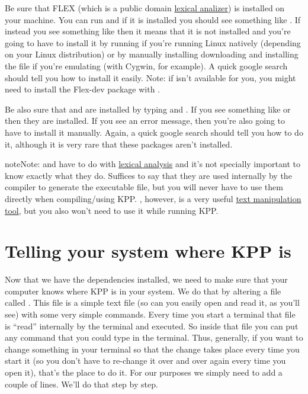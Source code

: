 \documentclass[letterpaper,10pt,openany,oneside]{sphinxmanual}
\begin{document}
Be sure that FLEX (which is a public domain \href{https://en.wikipedia.org/wiki/Lexical\_analysis}{lexical analizer}) is installed on your
machine. You can run  and if it is installed you should see
something like . If instead you see something like  then it means that it is not installed and you're going to
have to install it by running  if
you're running Linux natively (depending on your Linux distribution) or by
manually installing downloading and installing the file if you're emulating
(with Cygwin, for example). A quick google search should tell you how to
install it easily. Note: if  isn't available for you, you might need to
install the Flex-dev package with .

Be also sure that  and  are installed by typing 
and . If you see something like  or
 then they are installed. If you see an error message, then
you're also going to have to install it manually. Again, a quick google search
should tell you how to do it, although it is very rare that these packages
aren't installed.

\begin{notice}{note}{Note:}
 and  have to do with \href{https://en.wikipedia.org/wiki/Lexical\_analysis}{lexical analysis}
and it's not specially important to know exactly what they do. Suffices to
say that they are used internally by the compiler to generate the executable
file, but you will never have to use them directly when compiling/using KPP.
, however, is a very useful \href{https://en.wikipedia.org/wiki/Sed}{text manipulation tool},
but you also won't need to use it
while running KPP.
\end{notice}


\section{Telling your system where KPP is}
\label{compiling:telling-your-system-where-kpp-is}
Now that we have the dependencies installed, we need to make sure that your
computer knows where KPP is in your system. We do that by altering a file
called . This file is a simple text file (so can you easily open and
read it, as you'll see) with some very simple commands. Every time you start a
terminal that file is ``read'' internally by the terminal and executed. So inside
that file you can put any command that you could type in the terminal. Thus,
generally, if you want to change something in your terminal so that the change
takes place every time you start it (so you don't have to re-change it over and
over again every time you open it), that's the place to do it. For our purposes
we simply need to add a couple of lines. We'll do that step by step.
\end{document}
